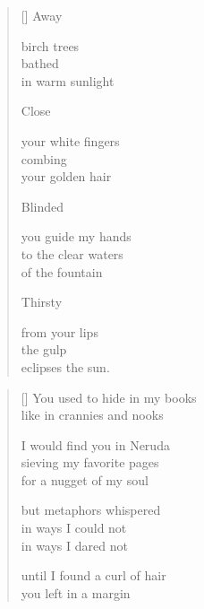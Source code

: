 \documentclass[14pt]{extbook}
\newcommand*{\centeredornament}{\centerline{\pgfornament[width=6cm]{88}}}
\begin{document}
\vspace*{-15mm}
\centeredornament
\vspace*{-7mm}


\settowidth{\versewidth}{to the clear waters}

\begin{verse}[\versewidth]
  Away

  birch trees \\
  bathed \\
  in warm sunlight

  Close

  your white fingers \\
  combing \\
  your golden hair

  Blinded

  you guide my hands \\
  to the clear waters \\
  of the fountain

  Thirsty

  from your lips \\
  the gulp \\
  eclipses the sun.
\end{verse}


\newpage

\vspace*{-15mm}
\centeredornament
\vspace*{-7mm}


\settowidth{\versewidth}{You used to hide in my books}

\begin{verse}[\versewidth]
  You used to hide in my books \\
  like in crannies and nooks

  I would find you in Neruda \\
  sieving my favorite pages \\
  for a nugget of my soul

  but metaphors whispered \\
  in ways I could not \\
  in ways I dared not

  until I found a curl of hair \\
  you left in a margin
\end{verse}
\end{document}
